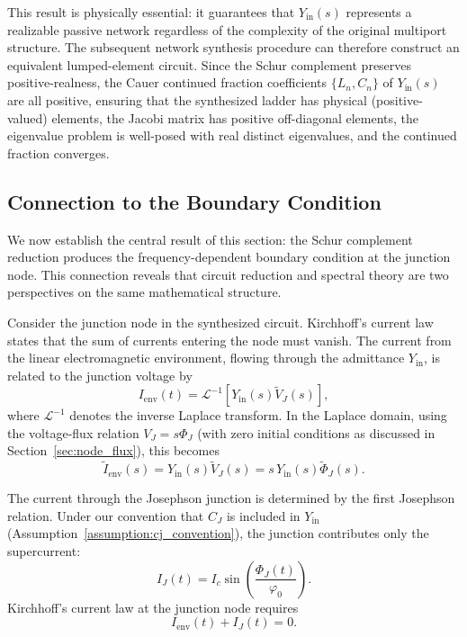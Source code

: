\documentclass[reprint, floatfix, superscriptaddress, amsmath, amssymb, longbibliography]{revtex4-2}
\begin{document}
This result is physically essential: it guarantees that $Y_{\mathrm{in}}(s)$ represents a realizable passive network regardless of the complexity of the original multiport structure. The subsequent network synthesis procedure can therefore construct an equivalent lumped-element circuit. Since the Schur complement preserves positive-realness, the Cauer continued fraction coefficients $\{L_n, C_n\}$ of $Y_{\mathrm{in}}(s)$ are all positive, ensuring that the synthesized ladder has physical (positive-valued) elements, the Jacobi matrix has positive off-diagonal elements, the eigenvalue problem is well-posed with real distinct eigenvalues, and the continued fraction converges.

\subsection{Connection to the Boundary Condition}
\label{sec:bc_connection}

We now establish the central result of this section: the Schur complement reduction produces the frequency-dependent boundary condition at the junction node. This connection reveals that circuit reduction and spectral theory are two perspectives on the same mathematical structure.

Consider the junction node in the synthesized circuit. Kirchhoff's current law states that the sum of currents entering the node must vanish. The current from the linear electromagnetic environment, flowing through the admittance $Y_{\mathrm{in}}$, is related to the junction voltage by
\begin{equation}
I_{\mathrm{env}}(t) = \mathcal{L}^{-1}\left[ Y_{\mathrm{in}}(s) \tilde{V}_J(s) \right],
\label{eq:env_current}
\end{equation}
where $\mathcal{L}^{-1}$ denotes the inverse Laplace transform. In the Laplace domain, using the voltage-flux relation $V_J = s\Phi_J$ (with zero initial conditions as discussed in Section~\ref{sec:node_flux}), this becomes
\begin{equation}
\tilde{I}_{\mathrm{env}}(s) = Y_{\mathrm{in}}(s) \tilde{V}_J(s) = s \, Y_{\mathrm{in}}(s) \tilde{\Phi}_J(s).
\label{eq:env_current_laplace}
\end{equation}

The current through the Josephson junction is determined by the first Josephson relation. Under our convention that $C_J$ is included in $Y_{\mathrm{in}}$ (Assumption~\ref{assumption:cj_convention}), the junction contributes only the supercurrent:
\begin{equation}
I_J(t) = I_c \sin\left(\frac{\Phi_J(t)}{\varphi_0}\right).
\label{eq:junction_current}
\end{equation}
Kirchhoff's current law at the junction node requires
\begin{equation}
I_{\mathrm{env}}(t) + I_J(t) = 0.
\label{eq:kcl}
\end{equation}
\end{document}
